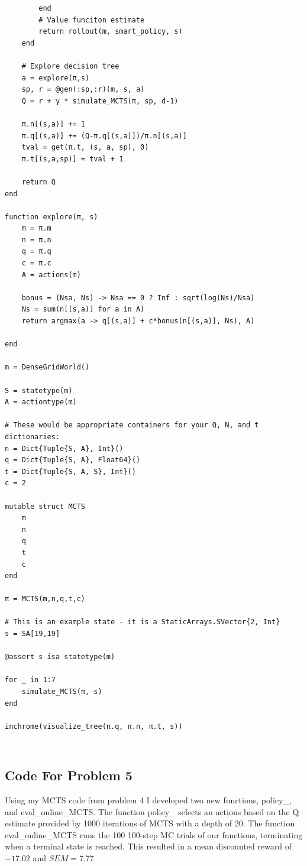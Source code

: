 \documentclass[11pt]{article}
\begin{document}
\begin{lstlisting}
        end
        # Value funciton estimate
        return rollout(m, smart_policy, s)
    end

    # Explore decision tree
    a = explore(π,s)
    sp, r = @gen(:sp,:r)(m, s, a)
    Q = r + γ * simulate_MCTS(π, sp, d-1)

    π.n[(s,a)] += 1
    π.q[(s,a)] += (Q-π.q[(s,a)])/π.n[(s,a)]
    tval = get(π.t, (s, a, sp), 0)
    π.t[(s,a,sp)] = tval + 1

    return Q
end

function explore(π, s)
    m = π.m
    n = π.n
    q = π.q
    c = π.c
    A = actions(m)

    bonus = (Nsa, Ns) -> Nsa == 0 ? Inf : sqrt(log(Ns)/Nsa)
    Ns = sum(n[(s,a)] for a in A)
    return argmax(a -> q[(s,a)] + c*bonus(n[(s,a)], Ns), A)

end

m = DenseGridWorld()

S = statetype(m)
A = actiontype(m)

# These would be appropriate containers for your Q, N, and t dictionaries:
n = Dict{Tuple{S, A}, Int}()
q = Dict{Tuple{S, A}, Float64}()
t = Dict{Tuple{S, A, S}, Int}()
c = 2

mutable struct MCTS
    m
    n
    q
    t
    c
end

π = MCTS(m,n,q,t,c)

# This is an example state - it is a StaticArrays.SVector{2, Int}
s = SA[19,19]

@assert s isa statetype(m)

for _ in 1:7
    simulate_MCTS(π, s)
end

inchrome(visualize_tree(π.q, π.n, π.t, s))


\end{lstlisting}

\section{}

\subsection{Code For Problem 5}

Using my MCTS code from problem 4 I developed two new functions, policy\_, and eval\_online\_MCTS.
The function policy\_ selects an actions based on the Q estimate provided by 1000 iterations of MCTS with a depth of 20.
The function eval\_online\_MCTS runs the 100 100-step MC trials of our functions, terminating when a terminal state is reached.
This resulted in a mean discounted reward of $-17.02$ and $SEM = 7.77$
\end{document}
